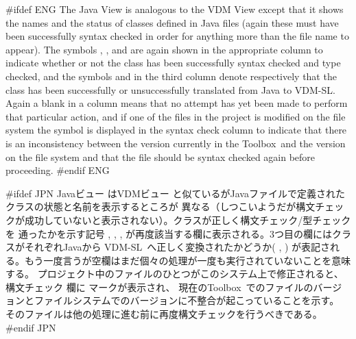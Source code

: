 \documentclass[\pformat,12pt]{article}
\newcommand{\vdmslpp}{VDM-SL}
\newcommand{\Toolbox}{Toolbox}
\newcommand{\vdmslpp}{VDM++}
\newcommand{\Toolbox}{Toolbox}
\newcommand{\guicmd}[1]{{\sf #1}}
\newcommand{\guicmd}[1]{{\gt #1}}
\begin{document}
#ifdef ENG
The \guicmd{Java View} is analogous to the \guicmd{VDM View} except
that it shows the names and the status of classes defined in Java
files (again these must have been successfully syntax checked in order
for anything more than the file name to appear). The
symbols 
,
,
 and
are again shown in the appropriate column to indicate whether or not
the class has been successfully syntax checked and type checked, and
the symbols 
and
in the third column denote respectively that the class has been
successfully or unsuccessfully translated from Java to \vdmslpp.
Again a blank in a column means that no attempt has yet been made to
perform that particular action, and if one of the files in the project
is modified on the file system the symbol
is displayed in the \guicmd{syntax check} column  to indicate
that there is an inconsistency between the version currently in the \Toolbox\ and the
version on the file system and that the file should be syntax checked
again before proceeding.
#endif ENG

#ifdef JPN
\guicmd{Javaビュー} は\guicmd{VDMビュー} と似ているがJavaファイルで定義されたクラスの状態と名前を表示するところが
異なる（しつこいようだが構文チェックが成功していないと表示されない）。クラスが正しく構文チェック/型チェックを
通ったかを示す記号
,
,
,
が再度該当する欄に表示される。3つ目の欄にはクラスがそれぞれJavaから \vdmslpp\ へ正しく変換されたかどうか(
,
)
が表記される。もう一度言うが空欄はまだ個々の処理が一度も実行されていないことを意味する。
プロジェクト中のファイルのひとつがこのシステム上で修正されると、\guicmd{構文チェック} 欄に 
マークが表示され、
現在の\Toolbox\ でのファイルのバージョンとファイルシステムでのバージョンに不整合が起こっていることを示す。
そのファイルは他の処理に進む前に再度構文チェックを行うべきである。
#endif JPN
\end{document}
